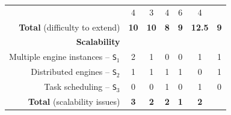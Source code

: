 \documentclass[preprint,3p,twocolumn]{elsarticle}
\begin{document}
\begin{table}
\begin{tabular}{rcccccc}
                                     & \cellcolor[HTML]{99DD99}4
                                     & \cellcolor[HTML]{99FF99}3
                                     & \cellcolor[HTML]{99DD99}4
                                     & \cellcolor[HTML]{999999}6
                                     & \cellcolor[HTML]{99DD99}4\\
  \textbf{Total} (difficulty to extend) & \cellcolor[HTML]{99D299}\textbf{10}
                                     & \cellcolor[HTML]{99D299}\textbf{10}
                                     & \cellcolor[HTML]{99FF99}\textbf{8}
                                     & \cellcolor[HTML]{99E899}\textbf{9}
                                     & \cellcolor[HTML]{999999}\textbf{12.5}
                                     & \cellcolor[HTML]{99E899}\textbf{9}\\
\cellcolor[HTML]{EEEEEE}\textbf{Scalability}& \multicolumn{6}{l}{\cellcolor[HTML]{EEEEEE}}\\
Multiple engine instances -- \texttt{S$_1$}& \cellcolor[HTML]{999999}2
                                     & \cellcolor[HTML]{99CC99}1
                                     & \cellcolor[HTML]{99FF99}0
                                     & \cellcolor[HTML]{99FF99}0
                                     & \cellcolor[HTML]{99CC99}1
                                     & \cellcolor[HTML]{99CC99}1\\
Distributed engines -- \texttt{S$_2$}& \cellcolor[HTML]{999999}1
                                     & \cellcolor[HTML]{999999}1
                                     & \cellcolor[HTML]{999999}1
                                     & \cellcolor[HTML]{999999}1
                                     & \cellcolor[HTML]{99FF99}0
                                     & \cellcolor[HTML]{999999}1\\
Task scheduling -- \texttt{S$_3$}    & \cellcolor[HTML]{99FF99}0
                                     & \cellcolor[HTML]{99FF99}0
                                     & \cellcolor[HTML]{999999}1
                                     & \cellcolor[HTML]{99FF99}0
                                     & \cellcolor[HTML]{999999}1
                                     & \cellcolor[HTML]{99FF99}0\\
\textbf{Total} (scalability issues)  & \cellcolor[HTML]{999999}\textbf{3}
                                     & \cellcolor[HTML]{99CC99}\textbf{2}
                                     & \cellcolor[HTML]{99CC99}\textbf{2}
                                     & \cellcolor[HTML]{99FF99}\textbf{1}
                                     & \cellcolor[HTML]{99CC99}\textbf{2}

\end{tabular}
\end{table}
\end{document}

